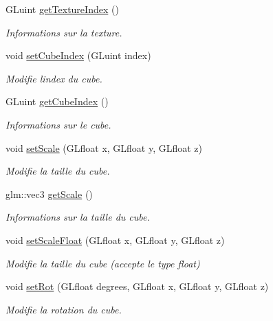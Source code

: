 \begin{DoxyCompactItemize}
G\+Luint \hyperlink{classglimac_1_1Cube_afba78172419c5bf02bf04420e2fa8b09}{get\+Texture\+Index} ()
\begin{DoxyCompactList}\small\item\em Informations sur la texture. \end{DoxyCompactList}\item 
void \hyperlink{classglimac_1_1Cube_aa98b9f6d9554e658643eac25815b0b02}{set\+Cube\+Index} (G\+Luint index)
\begin{DoxyCompactList}\small\item\em Modifie l\textquotesingle{}index du cube. \end{DoxyCompactList}\item 
G\+Luint \hyperlink{classglimac_1_1Cube_a44474e1c5c5c77118922294f63f553f5}{get\+Cube\+Index} ()
\begin{DoxyCompactList}\small\item\em Informations sur le cube. \end{DoxyCompactList}\item 
void \hyperlink{classglimac_1_1Cube_ac79f2d273f24a4ff19c78e6e3e55221a}{set\+Scale} (G\+Lfloat x, G\+Lfloat y, G\+Lfloat z)
\begin{DoxyCompactList}\small\item\em Modifie la taille du cube. \end{DoxyCompactList}\item 
glm\+::vec3 \hyperlink{classglimac_1_1Cube_a354f33cc28a98c481620f7f349fef1f1}{get\+Scale} ()
\begin{DoxyCompactList}\small\item\em Informations sur la taille du cube. \end{DoxyCompactList}\item 
void \hyperlink{classglimac_1_1Cube_a846bf811b0634b6e353cb24b73d7bd71}{set\+Scale\+Float} (G\+Lfloat x, G\+Lfloat y, G\+Lfloat z)
\begin{DoxyCompactList}\small\item\em Modifie la taille du cube (accepte le type float) \end{DoxyCompactList}\item 
void \hyperlink{classglimac_1_1Cube_af89fa188e904dd7db6ebccff5f4c3f4f}{set\+Rot} (G\+Lfloat degrees, G\+Lfloat x, G\+Lfloat y, G\+Lfloat z)
\begin{DoxyCompactList}\small\item\em Modifie la rotation du cube. \end{DoxyCompactList}\item 

\end{DoxyCompactItemize}
